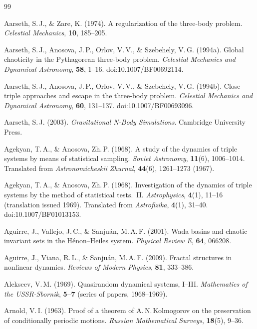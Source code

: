 \documentclass[11pt,a4paper]{article}
\begin{document}
\begin{thebibliography}{99}

Aarseth, S.\,J., \& Zare, K. (1974).
A regularization of the three-body problem.
\textit{Celestial Mechanics}, \textbf{10}, 185--205.

Aarseth, S.\,J., Anosova, J.\,P., Orlov, V.\,V., \& Szebehely, V.\,G. (1994a).
Global chaoticity in the Pythagorean three-body problem.
\textit{Celestial Mechanics and Dynamical Astronomy}, \textbf{58}, 1--16.
doi:10.1007/BF00692114.

Aarseth, S.\,J., Anosova, J.\,P., Orlov, V.\,V., \& Szebehely, V.\,G. (1994b).
Close triple approaches and escape in the three-body problem.
\textit{Celestial Mechanics and Dynamical Astronomy}, \textbf{60}, 131--137.
doi:10.1007/BF00693096.

Aarseth, S.\,J. (2003).
\textit{Gravitational N-Body Simulations}.
Cambridge University Press.

Agekyan, T.\,A., \& Anosova, Zh.\,P. (1968).
A study of the dynamics of triple systems by means of statistical sampling.
\textit{Soviet Astronomy}, \textbf{11}(6), 1006--1014.
Translated from \textit{Astronomicheskii Zhurnal}, \textbf{44}(6), 1261--1273 (1967).

Agekyan, T.\,A., \& Anosova, Zh.\,P. (1968).
Investigation of the dynamics of triple systems by the method of statistical tests.\ II.
\textit{Astrophysics}, \textbf{4}(1), 11--16 (translation issued 1969).
Translated from \textit{Astrofizika}, \textbf{4}(1), 31--40.
doi:10.1007/BF01013153.

Aguirre, J., Vallejo, J.\,C., \& Sanju\'{a}n, M.\,A.\,F. (2001).
Wada basins and chaotic invariant sets in the H\'{e}non--Heiles system.
\textit{Physical Review E}, \textbf{64}, 066208.

Aguirre, J., Viana, R.\,L., \& Sanju\'{a}n, M.\,A.\,F. (2009).
Fractal structures in nonlinear dynamics.
\textit{Reviews of Modern Physics}, \textbf{81}, 333--386.

Alekseev, V.\,M. (1969).
Quasirandom dynamical systems, I--III.
\textit{Mathematics of the USSR-Sbornik}, \textbf{5--7} (series of papers, 1968--1969).

Arnold, V.\,I. (1963).
Proof of a theorem of A.\,N.\,Kolmogorov on the preservation of conditionally periodic motions.
\textit{Russian Mathematical Surveys}, \textbf{18}(5), 9--36.


\end{thebibliography}
\end{document}
